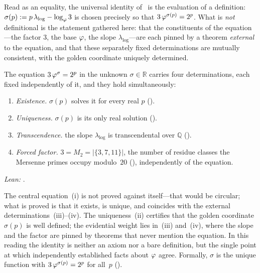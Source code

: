Read as an equality, the universal identity of~ is the
evaluation of a definition: $\sigma(p):=p\,\lambda_{\log}-\log_{\varphi}3$ is
chosen precisely so that $3\,\varphi^{\sigma(p)}=2^{p}$.  What is \emph{not}
definitional is the statement gathered here: that the constituents of the
equation---the factor $3$, the base $\varphi$, the slope
$\lambda_{\log}$---are each pinned by a theorem \emph{external} to the
equation, and that these separately fixed determinations are mutually
consistent, with the golden coordinate uniquely determined.

\begin{Theorem}\label{thm:characterization}
The equation $3\,\varphi^{\sigma}=2^{p}$ in the unknown $\sigma\in\mathbb{R}$
carries four determinations, each fixed independently of it, and they hold
simultaneously:
\begin{enumerate}
\item[\textup{(i)}] \emph{Existence.} $\sigma(p)$ solves it for every real
  $p$ ().
\item[\textup{(ii)}] \emph{Uniqueness.} $\sigma(p)$ is its only real
  solution ().
\item[\textup{(iii)}] \emph{Transcendence.} the slope $\lambda_{\log}$ is
  transcendental over $\mathbb{Q}$ ().
\item[\textup{(iv)}] \emph{Forced factor.} $3=M_{2}=|\{3,7,11\}|$, the number
  of residue classes the Mersenne primes occupy modulo~$20$
  (), independently of the equation.
\end{enumerate}
\emph{Lean:} .
\end{Theorem}

\begin{Remark}\label{rem:characterization}
The central equation~(i) is not proved against itself---that would be
circular; what is proved is that it exists, is unique, and coincides with
the external determinations~(iii)--(iv).  The uniqueness~(ii) certifies that
the golden coordinate $\sigma(p)$ is well defined; the evidential weight
lies in~(iii) and~(iv), where the slope and the factor are pinned by
theorems that never mention the equation.  In this reading the identity is
neither an axiom nor a bare definition, but the single point at which
independently established facts about $\varphi$ agree.  Formally, $\sigma$
is the unique function with $3\,\varphi^{\sigma(p)}=2^{p}$ for all~$p$
().
\end{Remark}


